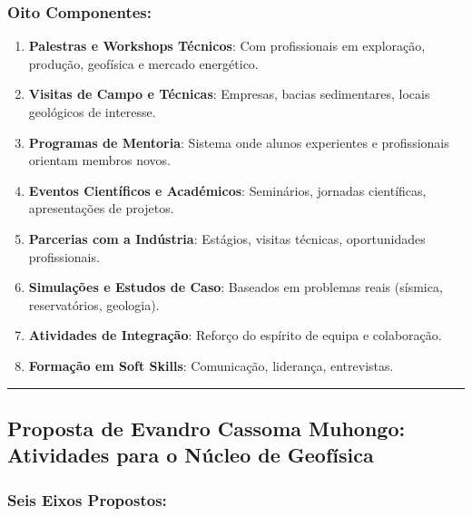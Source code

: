 \documentclass[12pt,a4paper]{article}
\begin{document}
\subsubsection*{Oito Componentes:}

\begin{enumerate}[itemsep=0.2cm]
    \item \textbf{Palestras e Workshops Técnicos}: Com profissionais em exploração, produção, geofísica e mercado energético.
    
    \item \textbf{Visitas de Campo e Técnicas}: Empresas, bacias sedimentares, locais geológicos de interesse.
    
    \item \textbf{Programas de Mentoria}: Sistema onde alunos experientes e profissionais orientam membros novos.
    
    \item \textbf{Eventos Científicos e Académicos}: Seminários, jornadas científicas, apresentações de projetos.
    
    \item \textbf{Parcerias com a Indústria}: Estágios, visitas técnicas, oportunidades profissionais.
    
    \item \textbf{Simulações e Estudos de Caso}: Baseados em problemas reais (sísmica, reservatórios, geologia).
    
    \item \textbf{Atividades de Integração}: Reforço do espírito de equipa e colaboração.
    
    \item \textbf{Formação em Soft Skills}: Comunicação, liderança, entrevistas.
\end{enumerate}

\textcolor{spe-secondary}{\hspace{0.5cm}\rule{0.4\linewidth}{0.8pt}}

\subsection{Proposta de Evandro Cassoma Muhongo: Atividades para o Núcleo de Geofísica}

\subsubsection*{Seis Eixos Propostos:}
\end{document}
